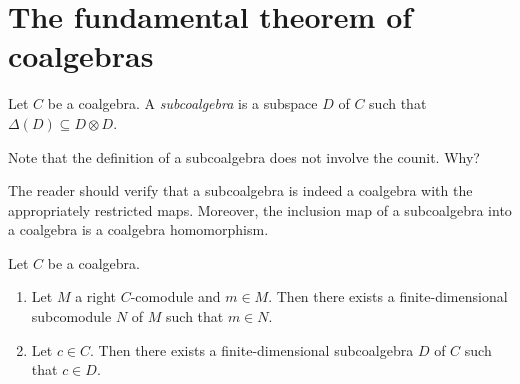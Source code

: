 \section{The fundamental theorem of coalgebras}

\begin{definition}
    Let $C$ be a coalgebra. A \emph{subcoalgebra} is
    a subspace $D$ of $C$ such that $\Delta(D)\subseteq D\otimes D$. 
\end{definition}

Note that the definition of a subcoalgebra does not involve the counit. Why?

The reader should verify that a subcoalgebra is indeed a coalgebra with the appropriately restricted maps. Moreover, the inclusion map of a subcoalgebra into a coalgebra is a coalgebra homomorphism.

\begin{theorem}
\label{thm:fundamental}
    Let $C$ be a coalgebra.
    \begin{enumerate}
        \item Let $M$ a right $C$-comodule and 
    $m\in M$. Then there exists a finite-dimensional
    subcomodule $N$ of $M$ such that $m\in N$. 
        \item Let $c\in C$. Then there exists a finite-dimensional subcoalgebra $D$ of
        $C$ such that $c\in D$. 
    \end{enumerate}
\end{theorem}

